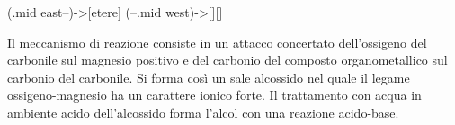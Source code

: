 \begin{reaction}\label{rxn:RCOOH->CO2}
	\+{,1.5em}
	\arrow(.mid east--){->[etere]}
	\arrow(--.mid west){->[][]}
\end{reaction}

Il meccanismo di reazione consiste in un attacco concertato dell'ossigeno del carbonile sul magnesio positivo e del carbonio del composto organometallico sul carbonio del carbonile. Si forma così un sale alcossido nel quale il legame ossigeno-magnesio ha un carattere ionico forte. Il trattamento con acqua in ambiente acido dell'alcossido forma l'alcol con una reazione acido-base.